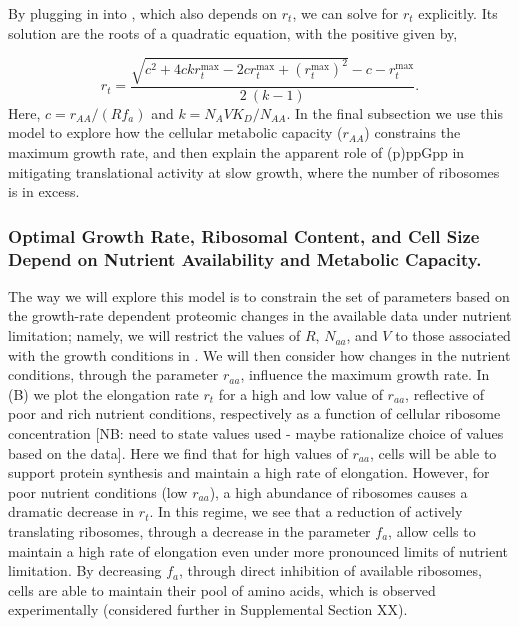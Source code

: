 By plugging in  into , which also depends on $r_t$, we
can solve for $r_t$ explicitly. Its solution are the roots of a quadratic equation,
with the positive given by,

\begin{equation}
r_t = \frac{\sqrt{c^2 + 4 c k r_{t}^{\text{max}} - 2 c r_{t}^{\text{max}} + (r_{t}^{\text{max}})^2} - c - r_{t}^{\text{max}}}{2 \ (k-1)}.
\label{eq:rt_final}
\end{equation}
Here, $c = r_{AA}/(R f_a)$ and $k = N_A V K_D / N_{AA}$. In the final
subsection we use this model to explore how the cellular metabolic capacity
($r_{AA}$) constrains the maximum growth rate, and then explain the apparent role
of (p)ppGpp in mitigating translational activity at slow growth, where the
number of ribosomes is in excess.

\subsubsection{Optimal Growth Rate, Ribosomal Content, and Cell Size Depend on Nutrient
Availability and Metabolic Capacity.}

The way we will explore this model is to constrain the set of parameters based
on the growth-rate dependent proteomic changes in the available data under
nutrient limitation;  namely, we will restrict the values of $R$, $N_{aa}$, and
$V$ to those associated with the growth conditions in \cite{schmidt2016}. We
will then consider how changes in the nutrient conditions, through the parameter
$r_{aa}$, influence the maximum growth rate. In (B) we
plot the elongation rate $r_t$ for a high and low value of $r_{aa}$, reflective
of poor and rich nutrient conditions, respectively as a function of cellular
ribosome concentration [NB: need to state values used - maybe rationalize choice
of values based on the data]. Here we find that for high values of $r_{aa}$,
cells will be able to support protein synthesis and maintain a high rate of
elongation. However, for poor nutrient conditions (low $r_{aa}$), a high
abundance of ribosomes causes a dramatic decrease in $r_t$. In this regime, we
see that a reduction of actively translating ribosomes, through a decrease in
the parameter $f_a$, allow cells to maintain a high rate of elongation even
under more pronounced limits of nutrient limitation. By decreasing $f_a$,
through direct inhibition of available ribosomes, cells are able to maintain
their pool of amino acids, which is observed experimentally (considered further in
Supplemental Section XX).


